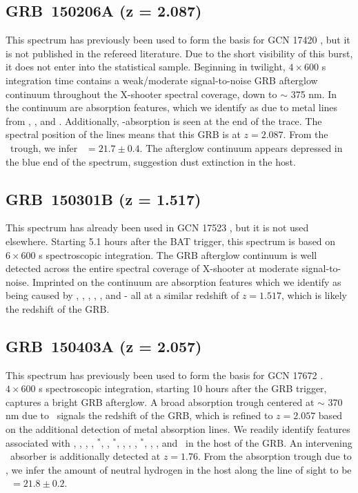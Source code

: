 \documentclass[longauth]{aa}    %
\begin{document}
\subsection{GRB~150206A (z = 2.087)}\label{150206}

This spectrum has previously been used to form the basis for GCN 17420
\citep{GCN17420}, but it is not published in the refereed literature. Due to the
short visibility of this burst, it does not enter into the statistical sample.
Beginning in twilight, $4\times600$ s integration time contains a weak/moderate
signal-to-noise GRB afterglow continuum throughout the X-shooter spectral
coverage, down to $\sim$ 375 nm. In the continuum are absorption features,
which we identify as due to metal lines from \znii, \feii, and \mgii.
Additionally, \lya-absorption is seen at the end of the trace. The spectral
position of the lines means that this GRB is at $z = 2.087$. From the
\lya~trough, we infer \nh~$=21.7 \pm 0.4$. The afterglow continuum appears
depressed in the blue end of the spectrum, suggestion dust extinction in the
host.

\subsection{GRB~150301B (z = 1.517)}\label{150301}

This spectrum has already been used in GCN 17523 \citep{GCN17523}, but it
is not used elsewhere. Starting 5.1 hours after the BAT trigger, this spectrum
is based on $6 \times 600$ s spectroscopic integration. The GRB afterglow
continuum is well detected across the entire spectral coverage of X-shooter at
moderate signal-to-noise. Imprinted on the continuum are absorption features
which we identify as being caused by \SIii, \civ, \alii, \feii, \mgii, and \mgi
- all at a similar redshift of $z = 1.517$, which is likely the redshift of the
GRB.

\subsection{GRB~150403A (z = 2.057)}\label{150403}

This spectrum has previously been used to form the basis for GCN 17672
\citep{GCN17672}. $4 \times 600$ s spectroscopic integration, starting 10 hours
after the GRB trigger, captures a bright GRB afterglow. A broad absorption
trough centered at $\sim$ 370 nm due to \lya~signals the redshift of the GRB,
which is refined to $z = 2.057$ based on the additional detection of metal
absorption lines. We readily identify features associated with \sii, \SIiv, \oi,
\SIii, \SIii$^*$, \cii, \cii$^*$, \civ, \alii, \feii, \feii$^*$, \mni, \mgii,
and \mgi~in the host of the GRB. An intervening \civ~absorber is additionally
detected at $z=1.76$. From the absorption trough due to \lya, we infer the
amount of neutral hydrogen in the host along the line of sight to be \nh~$=21.8
\pm 0.2$.
\end{document}
